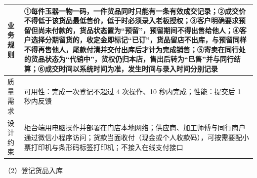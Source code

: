 {\begin{longtable}{@{}L{3.0cm} L{12.3cm}@{}}
\midrule
业务规则 & ①每件玉器一物一码，一件货品同时只能有一条有效成交记录；\newline ②成交价不得低于该货品最低售价，低于时必须录入老板授权；\newline ③客户明确要求预留但尚未付款的，货品状态置为“预留”，预留期间不得出售给他人；\newline ④客户选择分期留货的，收定金即标记“已订”，货品留店不出库，与预留同样不得再售他人，尾款付清并交付出库后才计为完成销售；\newline ⑤寄卖在同行处的货品状态为“代销中”，货权仍归本店，售出后转为“已售”并与同行结算；\newline ⑥成交时间以系统时间为准，发生时间与录入时间分别记录 \\
\midrule
质量需求 & 可用性：完成一次登记不超过 4 次操作、10 秒内完成；\newline 性能：提交后 1 秒内反馈 \\
\midrule
设计约束 & 柜台端用电脑操作并部署在门店本地网络；供应商、加工师傅与同行商户通过微信小程序访问；货款当面收付（现金或个人收款码），可按需要配小票打印机与条形码标签打印机；不接入在线支付接口 \\
\midrule
\bottomrule
\end{longtable}}
\noindent（2）登记货品入库

